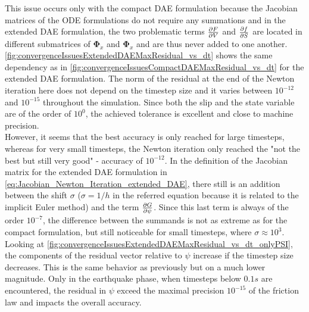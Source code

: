 This issue occurs only with the compact DAE formulation because the Jacobian matrices of the ODE formulations do not require any summations and in the extended DAE formulation, the two problematic terms $\pdv{F}{V}$ and $\pdv{f}{S}$ are located in different submatrices of $\bm{\Phi}_{\dot{x}}$ and $\bm{\Phi}_x$ and are thus never added to one another. \autoref{fig:convergenceIssuesExtendedDAEMaxResidual_vs_dt} shows the same dependency as in \autoref{fig:convergenceIssuesCompactDAEMaxResidual_vs_dt} for the extended DAE formulation. The norm of the residual at the end of the Newton iteration here does not depend on the timestep size and it varies between $10^{-12}$ and $10^{-15}$ throughout the simulation. Since both the slip and the state variable are of the order of $10^0$, the achieved tolerance is excellent and close to machine precision. \\
However, it seems that the best accuracy is only reached for large timesteps, whereas for very small timesteps, the Newton iteration only reached the "not the best but still very good" - accuracy of $10^{-12}$. In the definition of the Jacobian matrix for the extended DAE formulation in \autoref{eq:Jacobian_Newton_Iteration_extended_DAE}, there still is an addition between the shift $\sigma$ ($\sigma=1/h$ in the referred equation because it is related to the implicit Euler method) and the term $\pdv{G}{\psi}$. Since this last term is always of the order $10^{-7}$, the difference between the summands is not as extreme as for the compact formulation, but still noticeable for small timesteps, where $\sigma \approx 10^3$. Looking at \autoref{fig:convergenceIssuesExtendedDAEMaxResidual_vs_dt_onlyPSI}, the components of the residual vector relative to $\psi$ increase if the timestep size decreases. This is the same behavior as previously but on a much lower magnitude. Only in the earthquake phase, when timesteps below $0.1s$ are encountered, the residual in $\psi$ exceed the maximal precision $10^{-15}$ of the friction law and impacts the overall accuracy. 

